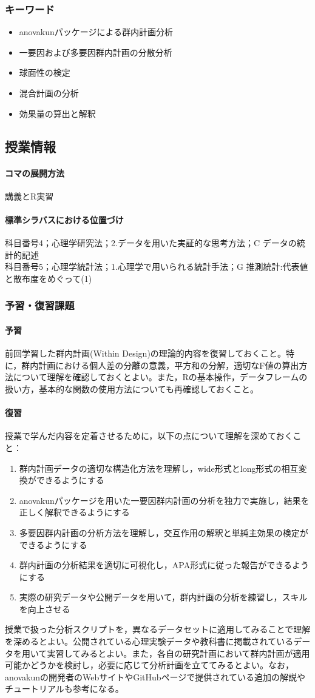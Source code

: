 \subsubsection{キーワード}
\begin{itemize}
	\item anovakunパッケージによる群内計画分析
	\item 一要因および多要因群内計画の分散分析
	\item 球面性の検定
	\item 混合計画の分析
	\item 効果量の算出と解釈
\end{itemize}
\subsection{授業情報}
\paragraph{コマの展開方法}
講義とR実習
\paragraph{標準シラバスにおける位置づけ}
科目番号4；心理学研究法；2.データを用いた実証的な思考方法；C データの統計的記述\\
科目番号5；心理学統計法；1.心理学で用いられる統計手法；G 推測統計:代表値と散布度をめぐって(1)
\subsubsection{予習・復習課題}
\paragraph{予習}
前回学習した群内計画(Within Design)の理論的内容を復習しておくこと。特に，群内計画における個人差の分離の意義，平方和の分解，適切なF値の算出方法について理解を確認しておくとよい。また，Rの基本操作，データフレームの扱い方，基本的な関数の使用方法についても再確認しておくこと。

\paragraph{復習}
授業で学んだ内容を定着させるために，以下の点について理解を深めておくこと：

\begin{enumerate}
\item 群内計画データの適切な構造化方法を理解し，wide形式とlong形式の相互変換ができるようにする
\item anovakunパッケージを用いた一要因群内計画の分析を独力で実施し，結果を正しく解釈できるようにする
\item 多要因群内計画の分析方法を理解し，交互作用の解釈と単純主効果の検定ができるようにする
\item 群内計画の分析結果を適切に可視化し，APA形式に従った報告ができるようにする
\item 実際の研究データや公開データを用いて，群内計画の分析を練習し，スキルを向上させる
\end{enumerate}

授業で扱った分析スクリプトを，異なるデータセットに適用してみることで理解を深めるとよい。公開されている心理実験データや教科書に掲載されているデータを用いて実習してみるとよい。また，各自の研究計画において群内計画が適用可能かどうかを検討し，必要に応じて分析計画を立ててみるとよい。なお，anovakunの開発者のWebサイトやGitHubページで提供されている追加の解説やチュートリアルも参考になる。
